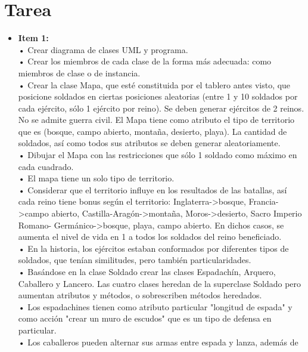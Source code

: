 \documentclass{article}
\begin{document}
\section{Tarea}
\begin{itemize}
	\item \textbf{Item 1:} 
		  \\• Crear diagrama de clases UML y programa.
	      \\• Crear los miembros de cada clase de la forma más adecuada: como miembros
	      de clase o de instancia.
	      \\• Crear la clase Mapa, que esté constituida por el tablero antes visto, que
	      posicione soldados en ciertas posiciones aleatorias (entre 1 y 10 soldados por
	      cada ejército, sólo 1 ejército por reino). Se deben generar ejércitos de 2 reinos.
	      No se admite guerra civil. El Mapa tiene como atributo el tipo de territorio que
	      es (bosque, campo abierto, montaña, desierto, playa). La cantidad de soldados,
	      así como todos sus atributos se deben generar aleatoriamente.
	      \\• Dibujar el Mapa con las restricciones que sólo 1 soldado como máximo en cada
	      cuadrado.
	      \\• El mapa tiene un solo tipo de territorio.
	      \\• Considerar que el territorio influye en los resultados de las batallas, así cada
	      reino tiene bonus según el territorio: Inglaterra->bosque, Francia->campo
	      abierto, Castilla-Aragón->montaña, Moros->desierto, Sacro Imperio Romano-
	      Germánico->bosque, playa, campo abierto. En dichos casos, se aumenta el
	      nivel de vida en 1 a todos los soldados del reino beneficiado.
	      \\• En la historia, los ejércitos estaban conformados por diferentes tipos de
	      soldados, que tenían similitudes, pero también particularidades.
	      \\• Basándose en la clase Soldado crear las clases Espadachín, Arquero, Caballero
	      y Lancero. Las cuatro clases heredan de la superclase Soldado pero aumentan
	      atributos y métodos, o sobrescriben métodos heredados.
	      \\• Los espadachines tienen como atributo particular "longitud de espada" y como
	      acción "crear un muro de escudos" que es un tipo de defensa en particular.
	      \\• Los caballeros pueden alternar sus armas entre espada y lanza, además de

\end{itemize}
\end{document}
